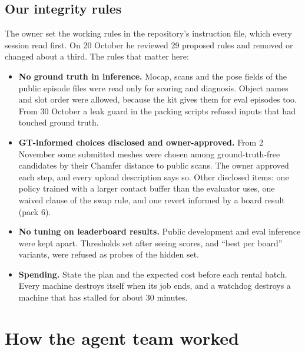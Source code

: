 \documentclass[11pt]{article}
\begin{document}
\subsection{Our integrity rules}
The owner set the working rules in the repository's instruction file, which every session read first. On 20 October he reviewed 29 proposed rules and removed or changed about a third. The rules that matter here:

\begin{itemize}[itemsep=2pt,topsep=3pt]
\item \textbf{No ground truth in inference.} Mocap, scans and the pose fields of the public episode files were read only for scoring and diagnosis. Object names and slot order were allowed, because the kit gives them for eval episodes too. From 30 October a leak guard in the packing scripts refused inputs that had touched ground truth.
\item \textbf{GT-informed choices disclosed and owner-approved.} From 2 November some submitted meshes were chosen among ground-truth-free candidates by their Chamfer distance to public scans. The owner approved each step, and every upload description says so. Other disclosed items: one policy trained with a larger contact buffer than the evaluator uses, one waived clause of the swap rule, and one revert informed by a board result (pack 6).
\item \textbf{No tuning on leaderboard results.} Public development and eval inference were kept apart. Thresholds set after seeing scores, and ``best per board'' variants, were refused as probes of the hidden set.
\item \textbf{Spending.} State the plan and the expected cost before each rental batch. Every machine destroys itself when its job ends, and a watchdog destroys a machine that has stalled for about 30 minutes.
\end{itemize}
\section{How the agent team worked}
\end{document}
